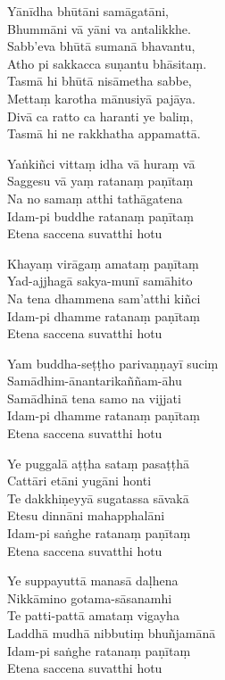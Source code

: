 \begin{paritta}

Yānīdha bhūtāni samāgatāni,\\
Bhummāni vā yāni va antalikkhe.\\
Sabb'eva bhūtā sumanā bhavantu,\\
Atho pi sakkacca suṇantu bhāsitaṃ.\\
Tasmā hi bhūtā nisāmetha sabbe,\\
Mettaṃ karotha mānusiyā pajāya.\\
Divā ca ratto ca haranti ye baliṃ,\\
Tasmā hi ne rakkhatha appamattā.


\label{yankinci-vittam}
%
Yaṅkiñci vittaṃ idha vā huraṃ vā\\
Saggesu vā yaṃ ratanaṃ paṇītaṃ\\
Na no samaṃ atthi tathāgatena\\
Idam-pi buddhe ratanaṃ paṇītaṃ\\
Etena saccena suvatthi hotu

\clearpage

%
Khayaṃ virāgaṃ amataṃ paṇītaṃ\\
Yad-ajjhagā sakya-munī samāhito\\
Na tena dhammena sam'atthi kiñci\\
Idam-pi dhamme ratanaṃ paṇītaṃ\\
Etena saccena suvatthi hotu

%
Yam buddha-seṭṭho parivaṇṇayī suciṃ\\
Samādhim-ānantarikaññam-āhu\\
Samādhinā tena samo na vijjati\\
Idam-pi dhamme ratanaṃ paṇītaṃ\\
Etena saccena suvatthi hotu

%
Ye puggalā aṭṭha sataṃ pasaṭṭhā\\
Cattāri etāni yugāni honti\\
Te dakkhiṇeyyā sugatassa sāvakā\\
Etesu dinnāni mahapphalāni\\
Idam-pi saṅghe ratanaṃ paṇītaṃ\\
Etena saccena suvatthi hotu

%
Ye suppayuttā manasā daḷhena\\
Nikkāmino gotama-sāsanamhi\\
Te patti-pattā amataṃ vigayha\\
Laddhā mudhā nibbutiṃ bhuñjamānā\\
Idam-pi saṅghe ratanaṃ paṇītaṃ\\
Etena saccena suvatthi hotu


\end{paritta}
